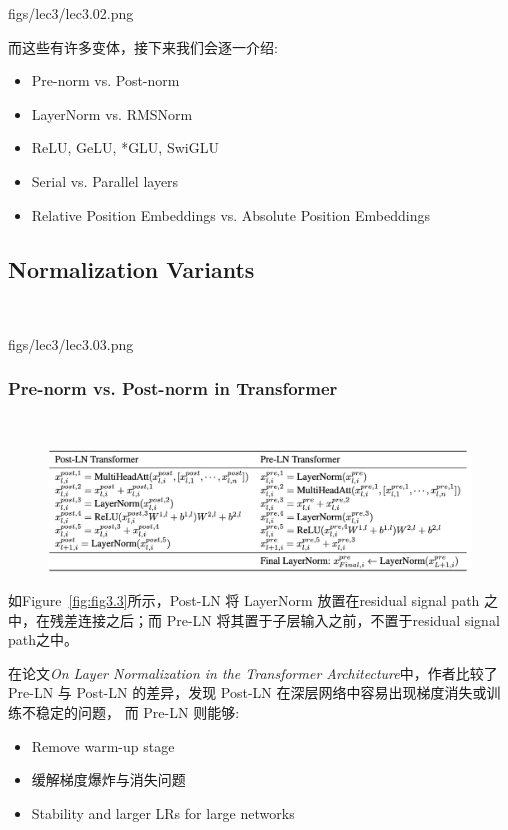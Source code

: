 \MarginImageWithNote
  {figs/lec3/lec3.02.png}
  {}
  {}

而这些有许多变体，接下来我们会逐一介绍:
\begin{itemize}
    \item Pre-norm vs. Post-norm
    \item LayerNorm vs. RMSNorm
    \item ReLU, GeLU, *GLU, SwiGLU
    \item Serial vs. Parallel layers
    \item Relative Position Embeddings vs. Absolute Position Embeddings
\end{itemize}

\clearpage
\subsection{Normalization Variants}~{}

\MarginImage
  {figs/lec3/lec3.03.png}
  {
  \label{fig:fig3.3}}


\subsubsection{Pre-norm vs. Post-norm in Transformer}~{}

\begin{figure}[htbp]
  \centering
  \includegraphics[width=1\linewidth]{figs/lec3/lec3.04.png}
  \label{fig:}
\end{figure}

如Figure~\ref{fig:fig3.3}所示，Post-LN 将 LayerNorm 放置在residual signal path 之中，在残差连接之后；而 Pre-LN 将其置于子层输入之前，不置于residual signal path之中。

在论文\textit{On Layer Normalization in the Transformer Architecture}中，作者比较了 Pre-LN 与 Post-LN 的差异，发现 Post-LN 在深层网络中容易出现梯度消失或训练不稳定的问题，
而 Pre-LN 则能够:

\begin{itemize}
  \item Remove warm-up stage
  \item 缓解梯度爆炸与消失问题  
  \item Stability and larger LRs for large networks
\end{itemize}

